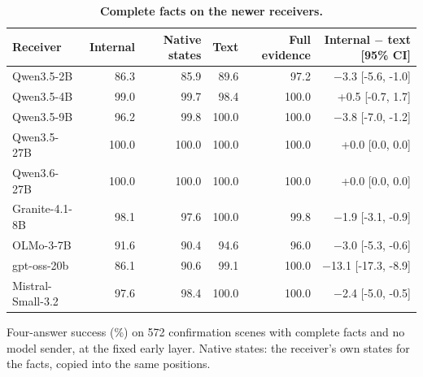 \begin{table}[!htbp]
\caption{\textbf{Complete facts on the newer receivers.}}
\label{tab:latest_literal}
\centering\small
\begin{tabular*}{\linewidth}{@{\extracolsep{\fill}}lrrrrr@{}}
\toprule
Receiver & Internal & Native states & Text & Full evidence & Internal $-$ text [95\% CI] \\
\midrule
Qwen3.5-2B & 86.3 & 85.9 & 89.6 & 97.2 & $-$3.3 [-5.6, -1.0] \\
Qwen3.5-4B & 99.0 & 99.7 & 98.4 & 100.0 & +0.5 [-0.7, 1.7] \\
Qwen3.5-9B & 96.2 & 99.8 & 100.0 & 100.0 & $-$3.8 [-7.0, -1.2] \\
Qwen3.5-27B & 100.0 & 100.0 & 100.0 & 100.0 & +0.0 [0.0, 0.0] \\
Qwen3.6-27B & 100.0 & 100.0 & 100.0 & 100.0 & +0.0 [0.0, 0.0] \\
Granite-4.1-8B & 98.1 & 97.6 & 100.0 & 99.8 & $-$1.9 [-3.1, -0.9] \\
OLMo-3-7B & 91.6 & 90.4 & 94.6 & 96.0 & $-$3.0 [-5.3, -0.6] \\
gpt-oss-20b & 86.1 & 90.6 & 99.1 & 100.0 & $-$13.1 [-17.3, -8.9] \\
Mistral-Small-3.2 & 97.6 & 98.4 & 100.0 & 100.0 & $-$2.4 [-5.0, -0.5] \\
\bottomrule
\end{tabular*}
\par\vspace{3pt}
{\footnotesize\raggedright Four-answer success (\%) on 572 confirmation scenes with complete facts and no model sender, at the fixed early layer. Native states: the receiver's own states for the facts, copied into the same positions.\par}
\end{table}
